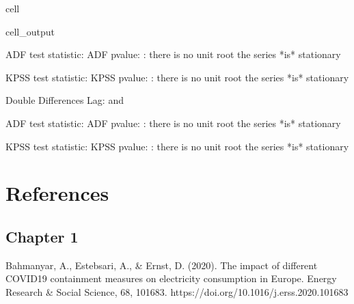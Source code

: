 \documentclass[letterpaper,10pt,english]{jupyterBook}
\begin{document}
\begin{sphinxuseclass}{cell}
\begin{sphinxuseclass}{cell_output}
\begin{sphinxVerbatim}[commandchars=\\\{\}]
ADF test statistic:  ADF p\PYGZhy{}value: \PYGZpc{}:
there is no unit root \PYGZhy{} the series *is* stationary

KPSS test statistic:  KPSS p\PYGZhy{}value: \PYGZpc{}:
there is no unit root \PYGZhy{} the series *is* stationary
\end{sphinxVerbatim}

\begin{sphinxVerbatim}[commandchars=\\\{\}]
Double Differences Lag:  and 
\end{sphinxVerbatim}

\begin{sphinxVerbatim}[commandchars=\\\{\}]
ADF test statistic:  ADF p\PYGZhy{}value: \PYGZpc{}:
there is no unit root \PYGZhy{} the series *is* stationary

KPSS test statistic:  KPSS p\PYGZhy{}value: \PYGZpc{}:
there is no unit root \PYGZhy{} the series *is* stationary
\end{sphinxVerbatim}

\end{sphinxuseclass}
\end{sphinxuseclass}

\chapter{References}
\label{\detokenize{references:references}}\label{\detokenize{references::doc}}

\section{Chapter 1}
\label{\detokenize{references:chapter-1}}
\sphinxAtStartPar
Bahmanyar, A., Estebsari, A., \& Ernst, D. (2020). The impact of different COVID\sphinxhyphen{}19 containment measures on electricity consumption in Europe. Energy Research \& Social Science, 68, 101683. https://doi.org/10.1016/j.erss.2020.101683
\end{document}
